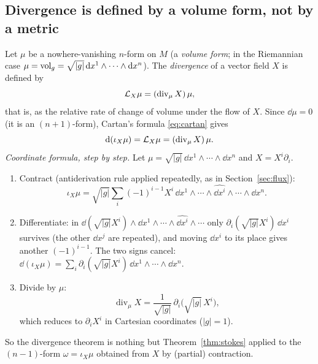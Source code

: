 \subsection{Divergence is defined by a volume form, not by a metric}\label{sec:divmu}

Let $\mu$ be a nowhere-vanishing $n$-form on $M$ (a \emph{volume form}; in the Riemannian case $\mu=\mathrm{vol}_g=\sqrt{|g|}\,\mathrm{d} x^1\wedge\cdots\wedge\mathrm{d} x^n$). The \emph{divergence} of a vector field $X$ is defined by
\begin{equation}\label{eq:Lmu}
\Lie_X\mu=(\operatorname{div}_\mu X)\,\mu,
\end{equation}
that is, as the relative rate of change of volume under the flow of $X$. Since $\dd\mu=0$ (it is an $(n+1)$-form), Cartan's formula \eqref{eq:cartan} gives
\begin{equation}\label{eq:divmu}
\dd(\iota_X\mu)=\Lie_X\mu=(\operatorname{div}_\mu X)\,\mu .
\end{equation}
\emph{Coordinate formula, step by step.} Let $\mu=\sqrt{|g|}\,\dd x^1\wedge\cdots\wedge\dd x^n$ and $X=X^i\partial_i$.
\begin{enumerate}
\item Contract (antiderivation rule applied repeatedly, as in Section~\ref{sec:flux}): \[\iota_X\mu=\sqrt{|g|}\sum_i(-1)^{i-1}X^i\,\dd x^1\wedge\cdots\wedge\widehat{\dd x^i}\wedge\cdots\wedge\dd x^n.\]
\item Differentiate: in $\dd(\sqrt{|g|}X^i)\wedge\dd x^1\wedge\cdots\wedge\widehat{\dd x^i}\wedge\cdots$ only $\partial_i(\sqrt{|g|}X^i)\,\dd x^i$ survives (the other $\dd x^j$ are repeated), and moving $\dd x^i$ to its place gives another $(-1)^{i-1}$. The two signs cancel: $\dd(\iota_X\mu)=\sum_i\partial_i(\sqrt{|g|}X^i)\,\dd x^1\wedge\cdots\wedge\dd x^n$.
\item Divide by $\mu$:
\begin{equation}\label{eq:divcoord}
\operatorname{div}_\mu X=\frac1{\sqrt{|g|}}\,\partial_i\bigl(\sqrt{|g|}\,X^i\bigr),
\end{equation}
which reduces to $\partial_iX^i$ in Cartesian coordinates ($|g|=1$).
\end{enumerate}
So the divergence theorem is nothing but Theorem~\ref{thm:stokes} applied to the $(n-1)$-form $\omega=\iota_X\mu$ obtained from $X$ by (partial) contraction.
